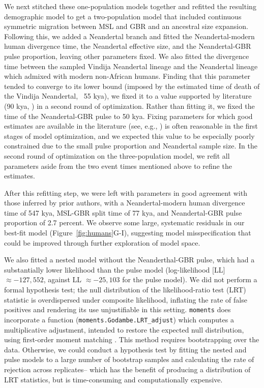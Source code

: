 \documentclass[]{article}
\newcommand{\moments}{\texttt{moments}\xspace}
\begin{document}
We next stitched these one-population models together and refitted the resulting 
demographic model to get a two-population model that included continuous 
symmetric migration between MSL and GBR and an ancestral size expansion. 
Following this, we added a Neandertal branch and fitted the 
Neandertal-modern human divergence time, the Neandertal effective size, and the 
Neandertal-GBR pulse proportion, leaving other parameters fixed. We also 
fitted the divergence time between the sampled Vindija Neandertal lineage and 
the Neandertal lineage which admixed with modern non-African humans. Finding 
that this parameter tended to converge to its lower bound (imposed by the 
estimated time of death of the Vindija Neandertal, ~55 kya), we fixed it to a 
value supported by literature (90 kya, \cite{prufer2017high}) in a second round 
of optimization. Rather than fitting it, we fixed the time of the Neandertal-GBR 
pulse to 50 kya. Fixing parameters for which good estimates are available in the 
literature  (see, e.g., \cite{sumer2025earliest}) is often reasonable in the 
first stages of model optimization, and we expected this value to be especially 
poorly constrained due to the small pulse proportion and Neandertal sample size. 
In the second round of optimization on the three-population model, we refit all 
parameters aside from the two event times mentioned above to refine the 
estimates. 

After this refitting step, we were left with parameters in good agreement with 
those inferred by prior authors, with a Neandertal-modern human divergence time 
of 547 kya, MSL-GBR split time of 77 kya, and Neandertal-GBR pulse proportion 
of 2.7 percent. We observe some large, systematic residuals in our best-fit model 
(Figure~\ref{fig:humans}G-I), suggesting model misspecification that could be
improved through further exploration of model space. 

We also fitted a nested model without the Neanderthal-GBR pulse, which had a 
substantially lower likelihood than the pulse model (log-likelihood [LL] 
$\approx -127,552$, against LL $\approx -25,103$ for the pulse model). We did 
not perform a formal hypothesis test; the null distribution of the 
likelihood-ratio test (LRT) statistic is overdispersed under composite 
likelihood, inflating the rate of false positives and rendering its use 
unjustifiable in this setting. \moments does incorporate a function 
(\texttt{moments.Godambe.LRT\_adjust}) which computes a multiplicative
adjustment, intended to restore the expected null distribution, using 
first-order moment matching \cite{coffman2016computationally}. This method 
requires bootstrapping over the data. Otherwise, we could conduct a hypothesis 
test by fitting the nested and pulse models to a large number of bootstrap 
samples and calculating the rate of rejection across replicates-- which has the 
benefit of producing a distribution of LRT statistics, but is time-consuming
and computationally expensive.  
\end{document}

